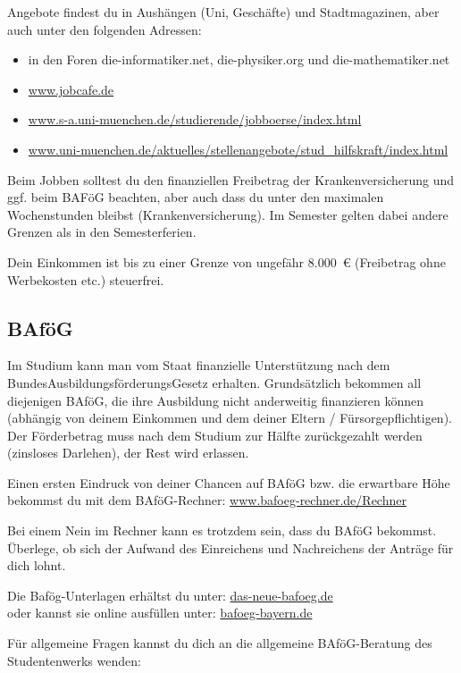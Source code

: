 Angebote findest du in Aushängen (Uni, Geschäfte) und Stadtmagazinen, aber auch unter den folgenden Adressen:
\begin{itemize}

\item in den Foren die-informatiker.net, die-physiker.org und die-mathematiker.net

\item \url{www.jobcafe.de}

\item \url{www.s-a.uni-muenchen.de/studierende/jobboerse/index.html}

\item \url{www.uni-muenchen.de/aktuelles/stellenangebote/stud_hilfskraft/index.html}
\end{itemize}

Beim Jobben solltest du den finanziellen Freibetrag der Krankenversicherung und ggf. beim BAFöG beachten, aber auch dass du unter den maximalen Wochenstunden bleibst (Krankenversicherung). Im Semester gelten dabei andere Grenzen als in den Semesterferien.

Dein Einkommen ist bis zu einer Grenze von ungefähr 8.000~€ (Freibetrag ohne Werbekosten etc.) steuerfrei.


\subsection{BAföG}
Im Studium kann man vom Staat finanzielle Unterstützung nach dem BundesAusbildungsförderungsGesetz erhalten. Grundsätzlich bekommen all diejenigen BAföG, die ihre Ausbildung nicht anderweitig finanzieren können (abhängig von deinem Einkommen und dem deiner Eltern / Fürsorgepflichtigen). Der Förderbetrag muss nach dem Studium zur Hälfte zurückgezahlt werden (zinsloses Darlehen), der Rest wird erlassen.

Einen ersten Eindruck von deiner Chancen auf BAföG bzw. die erwartbare
Höhe bekommst du mit dem BAföG-Rechner:
\url{www.bafoeg-rechner.de/Rechner}

Bei einem Nein im Rechner kann es trotzdem sein, dass du BAföG
bekommst. Überlege, ob sich der Aufwand des Einreichens und
Nachreichens der Anträge für dich lohnt.

Die Bafög-Unterlagen erhältst du unter: \url{das-neue-bafoeg.de}\\
oder kannst sie online ausfüllen unter: \url{bafoeg-bayern.de}

Für allgemeine Fragen kannst du dich an die allgemeine BAföG-Beratung des Studentenwerks wenden:

